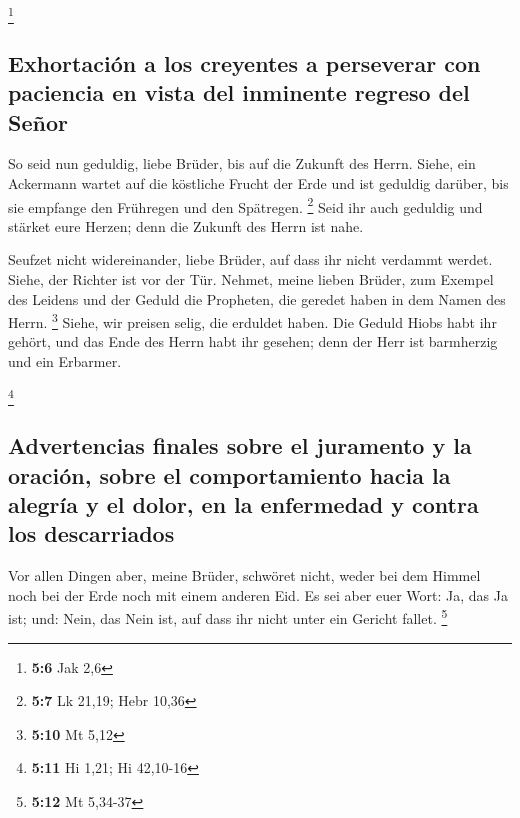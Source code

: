\footnote{\textbf{5:6} Jak 2,6}

\hypertarget{exhortaciuxf3n-a-los-creyentes-a-perseverar-con-paciencia-en-vista-del-inminente-regreso-del-seuxf1or}{%
\subsection{Exhortación a los creyentes a perseverar con paciencia en
vista del inminente regreso del
Señor}\label{exhortaciuxf3n-a-los-creyentes-a-perseverar-con-paciencia-en-vista-del-inminente-regreso-del-seuxf1or}}

 So seid nun geduldig, liebe Brüder, bis auf die Zukunft
des Herrn. Siehe, ein Ackermann wartet auf die köstliche Frucht der Erde
und ist geduldig darüber, bis sie empfange den Frühregen und den
Spätregen. \footnote{\textbf{5:7} Lk 21,19; Hebr 10,36} 
Seid ihr auch geduldig und stärket eure Herzen; denn die Zukunft des
Herrn ist nahe.

 Seufzet nicht widereinander, liebe Brüder, auf dass ihr
nicht verdammt werdet. Siehe, der Richter ist vor der Tür.
 Nehmet, meine lieben Brüder, zum Exempel des Leidens und
der Geduld die Propheten, die geredet haben in dem Namen des Herrn.
\footnote{\textbf{5:10} Mt 5,12}  Siehe, wir preisen
selig, die erduldet haben. Die Geduld Hiobs habt ihr gehört, und das
Ende des Herrn habt ihr gesehen; denn der Herr ist barmherzig und ein
Erbarmer.

\footnote{\textbf{5:11} Hi 1,21; Hi 42,10-16}

\hypertarget{advertencias-finales-sobre-el-juramento-y-la-oraciuxf3n-sobre-el-comportamiento-hacia-la-alegruxeda-y-el-dolor-en-la-enfermedad-y-contra-los-descarriados}{%
\subsection{Advertencias finales sobre el juramento y la oración, sobre
el comportamiento hacia la alegría y el dolor, en la enfermedad y contra
los
descarriados}\label{advertencias-finales-sobre-el-juramento-y-la-oraciuxf3n-sobre-el-comportamiento-hacia-la-alegruxeda-y-el-dolor-en-la-enfermedad-y-contra-los-descarriados}}

 Vor allen Dingen aber, meine Brüder, schwöret nicht,
weder bei dem Himmel noch bei der Erde noch mit einem anderen Eid. Es
sei aber euer Wort: Ja, das Ja ist; und: Nein, das Nein ist, auf dass
ihr nicht unter ein Gericht fallet. \footnote{\textbf{5:12} Mt 5,34-37}

